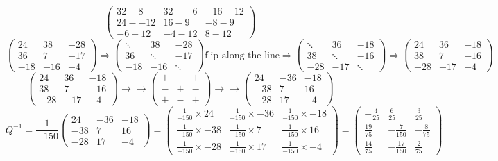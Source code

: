 \documentclass{article}
\begin{document}
\[
	\begin{pmatrix}
		32-8 & 32--6 & -16-12\\
		24--12 & 16-9 & -8-9\\
		-6-12 & -4-12 & 8-12
	\end{pmatrix}
\]
\[
	\begin{pmatrix}
		24 & 38 & -28\\
		36 & 7 & -17\\
		-18 & -16 & -4
	\end{pmatrix}
	\Rightarrow
	\begin{pmatrix}
		\ddots & 38 & -28\\
		36 & \ddots & -17\\
		-18 & -16 & \ddots
	\end{pmatrix}
	\mbox{flip along the line}
	\Rightarrow
	\begin{pmatrix}
		\ddots & 36 & -18\\
		38 & \ddots & -16\\
		-28 & -17 & \ddots
	\end{pmatrix}
	\Rightarrow
	\begin{pmatrix}
		24 & 36 & -18\\
		38 & 7 & -16\\
		-28 & -17 & -4
	\end{pmatrix}
\]
\[
	\begin{pmatrix}
		24 & 36 & -18\\
		38 & 7 & -16\\
		-28 & -17 & -4
	\end{pmatrix}
	\rightarrow
	\rightarrow
	\begin{pmatrix}
		+ & - & +\\
		- & + & -\\
		+ & - & +
	\end{pmatrix}
	\rightarrow
	\rightarrow
	\begin{pmatrix}
		24 & -36 & -18\\
		-38 & 7 & 16\\
		-28 & 17 & -4
	\end{pmatrix}
\]
\[
	Q^{-1} = 
	\frac{1}{-150}
	\begin{pmatrix}
		24 & -36 & -18\\
		-38 & 7 & 16\\
		-28 & 17 & -4
	\end{pmatrix}
	=
	\begin{pmatrix}
		\frac{1}{-150}\times24 & \frac{1}{-150}\times-36 & \frac{1}{-150}\times-18\\
		\frac{1}{-150}\times-38 & \frac{1}{-150}\times7 & \frac{1}{-150}\times16\\
		\frac{1}{-150}\times-28 & \frac{1}{-150}\times17 & \frac{1}{-150}\times-4
	\end{pmatrix}
	=
	\begin{pmatrix}
		-\frac{4}{25} & \frac{6}{25} & \frac{3}{25}\\
		\frac{19}{75} & -\frac{7}{150} & -\frac{8}{75}\\
		\frac{14}{75} & -\frac{17}{150} & \frac{2}{75}
	\end{pmatrix}
\]
\end{document}
